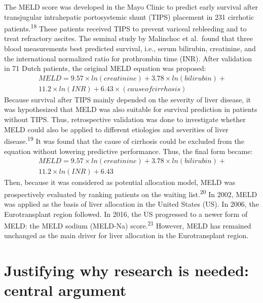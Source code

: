 \documentclass[11pt,english,]{book} %
\begin{document}
The MELD score was developed in the Mayo Clinic to predict early survival after transjugular intrahepatic portosystemic shunt (TIPS) placement in 231 cirrhotic patients.\textsuperscript{18} These patients received TIPS to prevent variceal rebleeding and to treat refractory ascites. The seminal study by Malinchoc et al.~found that three blood measurements best predicted survival, i.e., serum bilirubin, creatinine, and the international normalized ratio for prothrombin time (INR). After validation in 71 Dutch patients, the original MELD equation was proposed:
\linespread{1}
\begin{align*}
\ MELD = 9.57\times ln(creatinine) + 3.78\times ln(bilirubin) +\\
\ 11.2\times ln(INR) + 6.43 \times(cause of cirrhosis)
\end{align*}
\linespread{1.213}
Because survival after TIPS mainly depended on the severity of liver disease, it was hypothesized that MELD was also suitable for survival prediction in patients without TIPS. Thus, retrospective validation was done to investigate whether MELD could also be applied to different etiologies and severities of liver disease.\textsuperscript{19} It was found that the cause of cirrhosis could be excluded from the equation without lowering predictive performance. Thus, the final form became:
\linespread{1}
\begin{align*}
\ MELD = 9.57\times ln(creatinine) + 3.78\times ln(bilirubin) +\\
\ 11.2\times ln(INR) + 6.43
\end{align*}
\linespread{1.213}
Then, because it was considered as potential allocation model, MELD was prospectively evaluated by ranking patients on the waiting list.\textsuperscript{20} In 2002, MELD was applied as the basis of liver allocation in the United States (US). In 2006, the Eurotransplant region followed. In 2016, the US progressed to a newer form of MELD: the MELD sodium (MELD-Na) score.\textsuperscript{21} However, MELD has remained unchanged as the main driver for liver allocation in the Eurotransplant region.

\hypertarget{justifying-why-research-is-needed-central-argument}{%
\section*{Justifying why research is needed: central argument}\label{justifying-why-research-is-needed-central-argument}}
\end{document}
